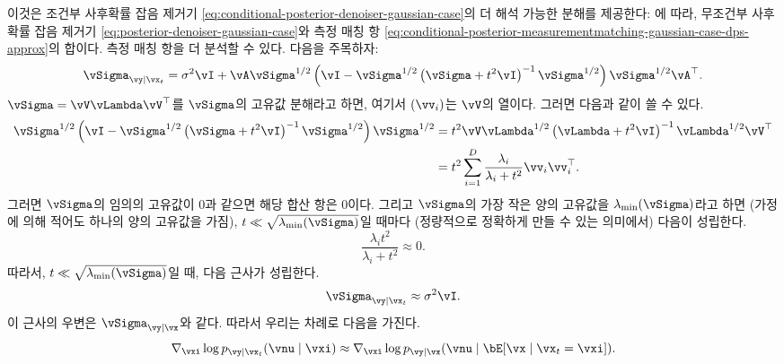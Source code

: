 \documentclass[../../book-main_ko.tex]{subfiles}
\begin{document}
\begin{example}
이것은 조건부 사후확률 잡음 제거기 \eqref{eq:conditional-posterior-denoiser-gaussian-case}의 더 해석 가능한 분해를 제공한다:
에 따라, 무조건부 사후확률 잡음 제거기 \eqref{eq:posterior-denoiser-gaussian-case}와 측정 매칭 항 \eqref{eq:conditional-posterior-measurementmatching-gaussian-case-dps-approx}의 합이다.
측정 매칭 항을 더 분석할 수 있다. 다음을 주목하자:
\begin{equation}
    \vSigma_{\vy \mid \vx_t}
    = 
    \sigma^2 \vI + \vA\vSigma^{1/2} \left(
      \vI - \vSigma^{1/2}\left(
      \vSigma + t^2 \vI
      \right)^{-1}
      \vSigma^{1/2}
    \right)\vSigma^{1/2}\vA^\top.
\end{equation}
\(\vSigma = \vV \vLambda \vV^\top\)를 $\vSigma$의 고유값 분해라고 하면, 여기서 $(\vv_i)$는 $\vV$의 열이다. 그러면 다음과 같이 쓸 수 있다.
\begin{align}
    \vSigma^{1/2}\left(
    \vI - \vSigma^{1/2}\left(
      \vSigma + t^2 \vI
    \right)^{-1}
    \vSigma^{1/2}
    \right) \vSigma^{1/2}
    &= 
    t^2 \vV \vLambda^{1/2}\left(
      \vLambda + t^2 \vI
    \right)^{-1}
    \vLambda^{1/2}
    \vV^\top
    \\
    &= 
    t^2 \sum_{i=1}^D
    \frac{\lambda_i}{\lambda_i + t^2}
    \vv_i \vv_i^\top.
\end{align}
그러면 $\vSigma$의 임의의 고유값이 0과 같으면 해당 합산 항은 0이다.
그리고 $\vSigma$의 가장 작은 양의 고유값을 $\lambda_{\min}(\vSigma)$라고 하면 (가정에 의해 적어도 하나의 양의 고유값을 가짐), $t \ll \sqrt{\lambda_{\min}(\vSigma)}$일 때마다 (정량적으로 정확하게 만들 수 있는 의미에서) 다음이 성립한다.
\begin{equation}
    \frac{\lambda_i t^2}{\lambda_i + t^2} \approx 0.
\end{equation}
따라서, $t \ll \sqrt{\lambda_{\min}(\vSigma)}$일 때, 다음 근사가 성립한다.
\begin{equation}
    \vSigma_{\vy \mid \vx_t} \approx \sigma^2 \vI.
\end{equation}
이 근사의 우변은 $\vSigma_{\vy \mid \vx}$와 같다.
따라서 우리는 차례로 다음을 가진다.
\begin{equation}
    \nabla_{\vxi} \log p_{\vy \mid \vx_t}(\vnu \mid \vxi)
    \approx
    \nabla_{\vxi} \log p_{\vy \mid \vx}(\vnu \mid \bE[\vx \mid \vx_t = \vxi]).
    \label{eq:conditional-posterior-measurementmatching-gaussian-case-dps-approx}
\end{equation}


\end{example}
\end{document}
